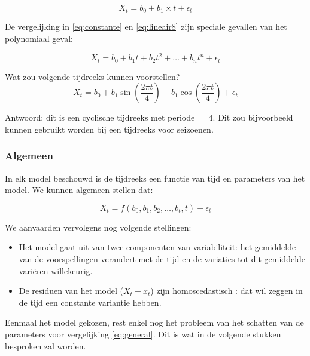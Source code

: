 \begin{equation}
	X_{t} = b_{0} + b_{1} \times t + \epsilon_{t}
\label{eq:lineair8}
\end{equation}

De vergelijking in \ref{eq:constante} en \ref{eq:lineair8} zijn speciale gevallen van het polynomiaal geval:

\begin{equation}
	X_{t} = b_{0} + b_{1} t + b_{2} t^{2} + \dots + b_{n} t^{n} + \epsilon_{t} 
\label{eq:polynomiaal}
\end{equation}

\begin{exercise}
	Wat zou volgende tijdreeks kunnen voorstellen?
	\begin{equation}
		X_{t} = b_{0} + b_{1} \sin(\frac{2\pi t}{4}) + b_{1} \cos(\frac{2\pi t}{4}) + \epsilon_{t}
	\label{eq:seasonal}
\end{equation}
\end{exercise}

Antwoord: dit is een cyclische tijdreeks met periode $= 4$. Dit zou bijvoorbeeld kunnen gebruikt worden bij een tijdreeks voor seizoenen.

\subsubsection{Algemeen}

In elk model beschouwd is de tijdreeks een functie van tijd en parameters van het model. We kunnen algemeen stellen dat:

\begin{equation}
	X_{t} = f(b_{0}, b_{1}, b_{2}, \dots , b_{t}, t) + \epsilon_{t}
\label{eq:general}
\end{equation}

We aanvaarden vervolgens nog volgende stellingen:
\begin{itemize}
	\item Het model gaat uit van twee componenten van variabiliteit: het gemiddelde van de voorspellingen verandert met de tijd en de variaties tot dit gemiddelde vari\"eren willekeurig.
	\item De residuen van het model ($X_{t} - x_{t}$) zijn homoscedastisch : dat wil zeggen in de tijd een constante variantie hebben.
\end{itemize}

Eenmaal het model gekozen, rest enkel nog het  probleem van het schatten van de parameters voor vergelijking \ref{eq:general}. Dit is wat in de volgende stukken besproken zal worden.

